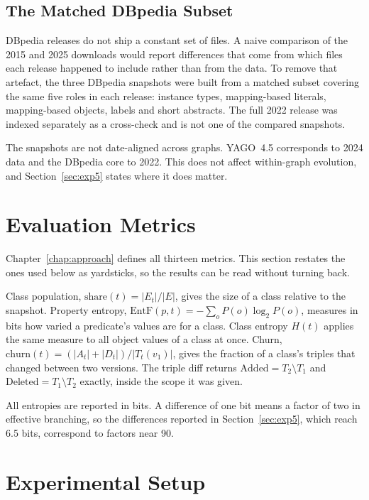\subsection{The Matched DBpedia Subset}
\label{subsec:matched}

DBpedia releases do not ship a constant set of files. A naive comparison of the
2015 and 2025 downloads would report differences that come from which files each
release happened to include rather than from the data. To remove that artefact,
the three DBpedia snapshots were built from a matched subset covering the same
five roles in each release: instance types, mapping-based literals,
mapping-based objects, labels and short abstracts. The full 2022 release was
indexed separately as a cross-check and is not one of the compared snapshots.

The snapshots are not date-aligned across graphs. YAGO~4.5 corresponds to 2024
data and the DBpedia core to 2022. This does not affect within-graph evolution,
and Section~\ref{sec:exp5} states where it does matter.

\section{Evaluation Metrics}
\label{sec:evaluation_metrics}

Chapter~\ref{chap:approach} defines all thirteen metrics. This section restates
the ones used below as yardsticks, so the results can be read without turning
back.

Class population, $\mathrm{share}(t) = |E_t| / |E|$, gives the size of a class
relative to the snapshot. Property entropy,
$\mathrm{EntF}(p,t) = -\sum_o P(o) \log_2 P(o)$, measures in bits how varied a
predicate's values are for a class. Class entropy $H(t)$ applies the same
measure to all object values of a class at once. Churn,
$\mathrm{churn}(t) = (|A_t| + |D_t|) / |T_t(v_1)|$, gives the fraction of a
class's triples that changed between two versions. The triple diff returns
$\mathrm{Added} = T_2 \setminus T_1$ and $\mathrm{Deleted} = T_1 \setminus T_2$
exactly, inside the scope it was given.

All entropies are reported in bits. A difference of one bit means a factor of two
in effective branching, so the differences reported in Section~\ref{sec:exp5},
which reach 6.5 bits, correspond to factors near 90.

\section{Experimental Setup}
\label{sec:experimental_setup}

